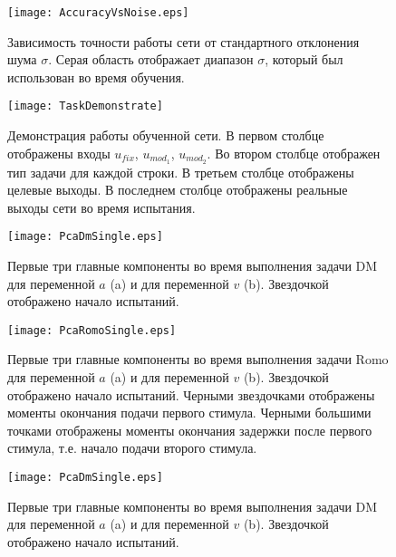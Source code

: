 \documentclass{article}
\begin{document}
\begin{figure}[h!] \label{fig:AccuracyVsNoise}
  \begin{center}
    \texttt{[image: AccuracyVsNoise.eps]}
    \caption{Зависимость точности работы сети от стандартного отклонения шума $\sigma$. Серая область отображает диапазон $\sigma$, который был использован во время обучения.}
  \end{center}
\end{figure}

\begin{figure}[h!] \label{fig:TaskDemonstrate}
  \begin{center}
    \texttt{[image: TaskDemonstrate]}
    \caption{Демонстрация работы обученной сети. В первом столбце отображены входы $u_{fix}$, $u_{mod_1}$, $u_{mod_2}$. Во втором столбце отображен тип задачи для каждой строки. В третьем столбце отображены целевые выходы. В последнем столбце отображены реальные выходы сети во время испытания.}
  \end{center}
\end{figure}

\begin{figure}[h!] \label{fig:PcaDmSingle}
  \begin{center}
    \texttt{[image: PcaDmSingle.eps]}
    \caption{Первые три главные компоненты во время выполнения задачи DM для переменной $a$ (a) и для переменной $v$ (b). Звездочкой отображено начало испытаний.}
  \end{center}
\end{figure}


\begin{figure}[h!] \label{fig:PcaRomoSingle}
  \begin{center}
    \texttt{[image: PcaRomoSingle.eps]}
    \caption{Первые три главные компоненты во время выполнения задачи Romo для переменной $a$ (a) и для переменной $v$ (b). Звездочкой отображено начало испытаний. Черными звездочками отображены моменты окончания подачи первого стимула. Черными большими точками отображены моменты окончания задержки после первого стимула, т.е. начало подачи второго стимула.}
  \end{center}
\end{figure}

\begin{figure}[h!] \label{fig:PcaDmSingle}
  \begin{center}
    \texttt{[image: PcaDmSingle.eps]}
    \caption{Первые три главные компоненты во время выполнения задачи DM для переменной $a$ (a) и для переменной $v$ (b). Звездочкой отображено начало испытаний.}
  \end{center}
\end{figure}
\end{document}
